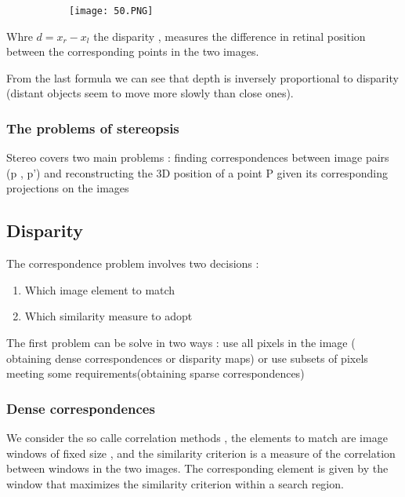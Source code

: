 \documentclass{article}
\begin{document}
\begin{figure}[ht!]
  \centering
  \begin{subfigure}[b]{0.5\linewidth}
    \texttt{[image: 50.PNG]}
  \end{subfigure}
\end{figure}

Whre $d = x_r - x_l$ the disparity , measures the difference in retinal position between the corresponding points in the two images.

From the last formula we can see that depth is inversely proportional to disparity (distant objects seem to move more slowly than close ones).

\subsubsection{The problems of stereopsis}

Stereo covers two main problems : finding correspondences between image pairs (p , p') and reconstructing the 3D position of a point P given its corresponding projections on the images

\subsection{Disparity}

The correspondence problem involves two decisions :

\begin{enumerate}
    \item Which image element to match
    \item Which similarity measure to adopt
\end{enumerate}

The first problem can be solve in two ways : use all pixels in the image ( obtaining dense correspondences or disparity maps) or use subsets of pixels meeting some requirements(obtaining sparse correspondences)


\subsubsection{Dense correspondences}

We consider the so calle correlation methods , the elements to match are image windows of fixed size , and the similarity criterion is a measure of the correlation between windows in the two images. The corresponding element is given by the window that maximizes the similarity criterion within a search region.
\end{document}
